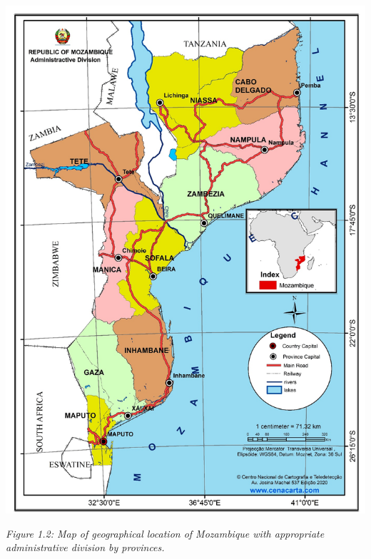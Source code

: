 \documentclass[
]{book}
\begin{document}
\includegraphics{Figure1.png}

\emph{Figure 1.2: Map of geographical location of Mozambique with appropriate administrative division by provinces.}
\end{document}
